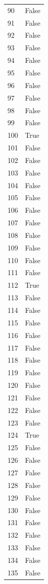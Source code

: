 \documentclass[
  letterpaper,
  DIV=11,
  numbers=noendperiod]{scrreprt}
\begin{document}
\begin{tabular}{ll}
90   &  False \\
91   &  False \\
92   &  False \\
93   &  False \\
94   &  False \\
95   &  False \\
96   &  False \\
97   &  False \\
98   &  False \\
99   &  False \\
100  &   True \\
101  &  False \\
102  &  False \\
103  &  False \\
104  &  False \\
105  &  False \\
106  &  False \\
107  &  False \\
108  &  False \\
109  &  False \\
110  &  False \\
111  &  False \\
112  &   True \\
113  &  False \\
114  &  False \\
115  &  False \\
116  &  False \\
117  &  False \\
118  &  False \\
119  &  False \\
120  &  False \\
121  &  False \\
122  &  False \\
123  &  False \\
124  &   True \\
125  &  False \\
126  &  False \\
127  &  False \\
128  &  False \\
129  &  False \\
130  &  False \\
131  &  False \\
132  &  False \\
133  &  False \\
134  &  False \\
135  &  False \\

\end{tabular}
\end{document}
